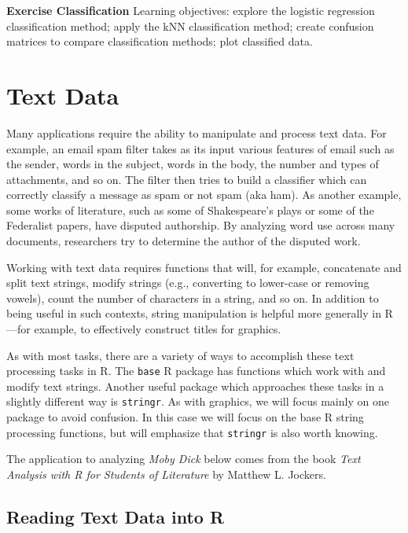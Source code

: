 \documentclass[
]{krantz}
\begin{document}
\textbf{Exercise Classification} Learning objectives: explore the logistic regression classification method; apply the kNN classification method; create confusion matrices to compare classification methods; plot classified data.

\hypertarget{xml}{%
\chapter{Text Data}\label{xml}}

Many applications require the ability to manipulate and process text data. For example, an email spam filter takes as its input various features of email such as the sender, words in the subject, words in the body, the number and types of attachments, and so on. The filter then tries to build a classifier which can correctly classify a message as spam or not spam (aka ham). As another example, some works of literature, such as some of Shakespeare's plays or some of the Federalist papers, have disputed authorship. By analyzing word use across many documents, researchers try to determine the author of the disputed work.

Working with text data requires functions that will, for example, concatenate and split text strings, modify strings (e.g., converting to lower-case or removing vowels), count the number of characters in a string, and so on. In addition to being useful in such contexts, string manipulation is helpful more generally in R---for example, to effectively construct titles for graphics.

As with most tasks, there are a variety of ways to accomplish these text processing tasks in R. The \texttt{base} R package has functions which work with and modify text strings. Another useful package which approaches these tasks in a slightly different way is \texttt{stringr}. As with graphics, we will focus mainly on one package to avoid confusion. In this case we will focus on the base R string processing functions, but will emphasize that \texttt{stringr} is also worth knowing.

The application to analyzing \emph{Moby Dick} below comes from the book \emph{Text Analysis with R for Students of Literature} by Matthew L. Jockers.

\hypertarget{reading-text-data-into-r}{%
\section{Reading Text Data into R}\label{reading-text-data-into-r}}
\end{document}

